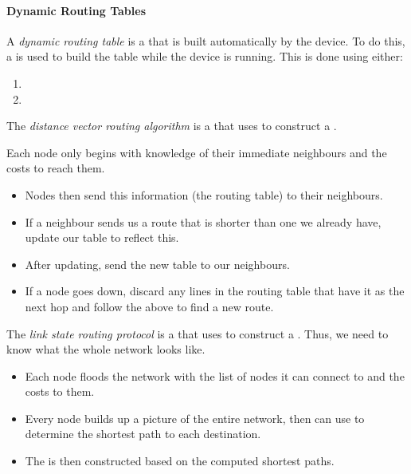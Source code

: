 \paragraph{Dynamic Routing Tables}\label{par:Dynamic_Routing_Tables}
\begin{definition}\label{def:Dynamic_Routing_Table}
  A \emph{dynamic routing table} is a  that is built automatically by the device.
  To do this, a  is used to build the table while the device is running.
  This is done using either:
  \begin{enumerate}[noitemsep]
  \item {}
  \item {}
  \end{enumerate}
\end{definition}

\begin{definition}\label{def:Distance_Vector_Routing_Protocol}
  The \emph{distance vector routing algorithm} is a  that uses  to construct a .
  
  Each node only begins with knowledge of their immediate neighbours and the costs to reach them.
  \begin{itemize}[noitemsep]
  \item Nodes then send this information (the routing table) to their neighbours.
  \item If a neighbour sends us a route that is shorter than one we already have, update our table to reflect this.
  \item After updating, send the new table to our neighbours.
  \item If a node goes down, discard any lines in the routing table that have it as the next hop and follow the above to find a new route.
  \end{itemize}
\end{definition}

\begin{definition}\label{def:Link_State_Routing_Protocol}
  The \emph{link state routing protocol} is a  that uses  to construct a .
  Thus, we need to know what the whole network looks like.
  
  \begin{itemize}[noitemsep]
  \item Each node floods the network with the list of nodes it can connect to and the costs to them.
  \item Every node builds up a picture of the entire network, then can use  to determine the shortest path to each destination.
  \item The  is then constructed based on the computed shortest paths.
  \end{itemize}
\end{definition}

